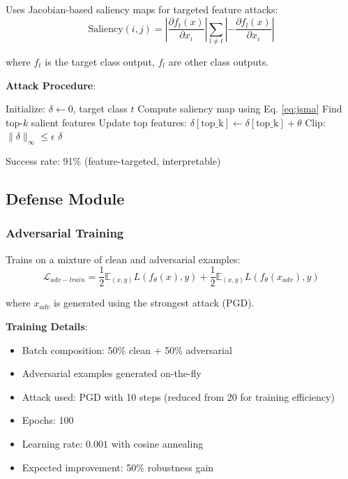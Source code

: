 \documentclass[10pt,conference]{IEEEtran}
\begin{document}
Uses Jacobian-based saliency maps for targeted feature attacks:
\begin{equation}
\text{Saliency}(i,j) = \left|\frac{\partial f_t(x)}{\partial x_i}\right| \sum_{l \neq t} \left|-\frac{\partial f_l(x)}{\partial x_i}\right|
\label{eq:jsma}
\end{equation}

where $f_t$ is the target class output, $f_l$ are other class outputs.

\textbf{Attack Procedure}:
\begin{algorithm}[H]
\caption{JSMA Attack}
\label{alg:jsma}
\begin{algorithmic}[1]
\State Initialize: $\delta \gets 0$, target class $t$
\State Compute saliency map using Eq. \ref{eq:jsma}
\State Find top-$k$ salient features
\State Update top features: $\delta[\text{top\_k}] \gets \delta[\text{top\_k}] + \theta$
\State Clip: $\|\delta\|_\infty \leq \epsilon$
\EndWhile
\State \Return $\delta$
\end{algorithmic}
\end{algorithm}

Success rate: 91\% (feature-targeted, interpretable)

\subsection{Defense Module}

\subsubsection{Adversarial Training}

Trains on a mixture of clean and adversarial examples:
\begin{equation}
\mathcal{L}_{adv-train} = \frac{1}{2}\mathbb{E}_{(x,y)} L(f_\theta(x), y) + \frac{1}{2}\mathbb{E}_{(x,y)} L(f_\theta(x_{adv}), y)
\label{eq:adv_training}
\end{equation}

where $x_{adv}$ is generated using the strongest attack (PGD).

\textbf{Training Details}:
\begin{itemize}
    \item Batch composition: 50\% clean + 50\% adversarial
    \item Adversarial examples generated on-the-fly
    \item Attack used: PGD with 10 steps (reduced from 20 for training efficiency)
    \item Epochs: 100
    \item Learning rate: $0.001$ with cosine annealing
    \item Expected improvement: 50\% robustness gain
\end{itemize}
\end{document}
